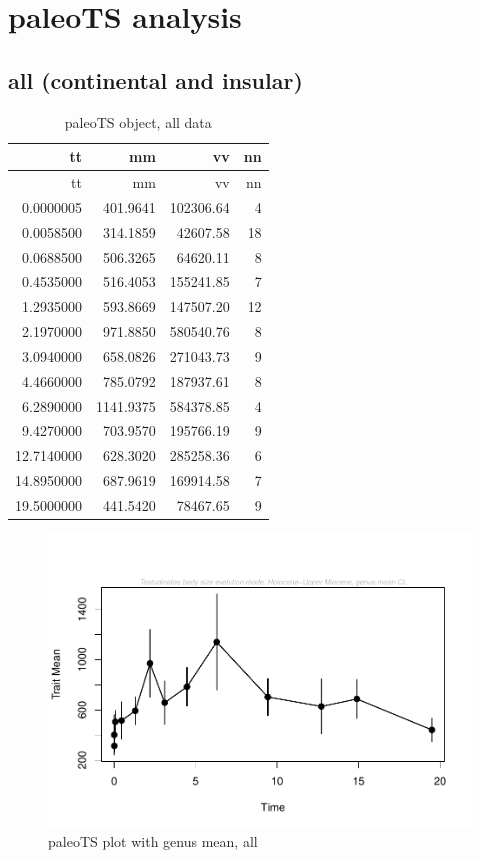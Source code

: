 \FloatBarrier

\section{paleoTS analysis}\label{paleots-analysis}

\subsection{all (continental and
	insular)}\label{all-continental-and-insular}


\begin{longtable}[]{@{}rrrr@{}}
	\caption{paleoTS object, all data}
	\label{tab:pTSall}\tabularnewline
	\toprule
	tt & mm & vv & nn\tabularnewline
	\midrule
	\endfirsthead
	\toprule
	tt & mm & vv & nn\tabularnewline
	\midrule
	\endhead
	0.0000005 & 401.9641 & 102306.64 & 4\tabularnewline
	0.0058500 & 314.1859 & 42607.58 & 18\tabularnewline
	0.0688500 & 506.3265 & 64620.11 & 8\tabularnewline
	0.4535000 & 516.4053 & 155241.85 & 7\tabularnewline
	1.2935000 & 593.8669 & 147507.20 & 12\tabularnewline
	2.1970000 & 971.8850 & 580540.76 & 8\tabularnewline
	3.0940000 & 658.0826 & 271043.73 & 9\tabularnewline
	4.4660000 & 785.0792 & 187937.61 & 8\tabularnewline
	6.2890000 & 1141.9375 & 584378.85 & 4\tabularnewline
	9.4270000 & 703.9570 & 195766.19 & 9\tabularnewline
	12.7140000 & 628.3020 & 285258.36 & 6\tabularnewline
	14.8950000 & 687.9619 & 169914.58 & 7\tabularnewline
	19.5000000 & 441.5420 & 78467.65 & 9\tabularnewline
	\bottomrule
\end{longtable}

\begin{figure}[htbp]
	\centering
	\includegraphics{MA_JJ_files/figure-latex/paleoTSAll-1.pdf}
	\caption{paleoTS plot with genus mean, all}
	\label{fig:pTSall}
\end{figure}

